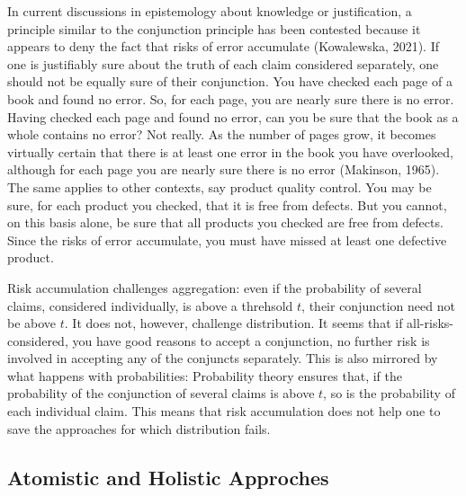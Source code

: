 \documentclass[
  10pt,
  dvipsnames,enabledeprecatedfontcommands]{scrartcl}
\begin{document}
In current discussions in epistemology about knowledge or justification,
a principle similar to the conjunction principle has been contested
because it appears to deny the fact that risks of error accumulate
(Kowalewska, 2021). If one is justifiably sure about the truth of each
claim considered separately, one should not be equally sure of their
conjunction. You have checked each page of a book and found no error.
So, for each page, you are nearly sure there is no error. Having checked
each page and found no error, can you be sure that the book as a whole
contains no error? Not really. As the number of pages grow, it becomes
virtually certain that there is at least one error in the book you have
overlooked, although for each page you are nearly sure there is no error
(Makinson, 1965). The same applies to other contexts, say product
quality control. You may be sure, for each product you checked, that it
is free from defects. But you cannot, on this basis alone, be sure that
all products you checked are free from defects. Since the risks of error
accumulate, you must have missed at least one defective product.

Risk accumulation challenges aggregation: even if the probability of
several claims, considered individually, is above a threhsold \(t\),
their conjunction need not be above \(t\). It does not, however,
challenge distribution. It seems that if all-risks-considered, you have
good reasons to accept a conjunction, no further risk is involved in
accepting any of the conjuncts separately. This is also mirrored by what
happens with probabilities: Probability theory ensures that, if the
probability of the conjunction of several claims is above \(t\), so is
the probability of each individual claim. This means that risk
accumulation does not help one to save the approaches for which
distribution fails.


\noindent

\hypertarget{atomistic-and-holistic-approches}{%
\subsection{Atomistic and Holistic
Approches}\label{atomistic-and-holistic-approches}}
\end{document}
